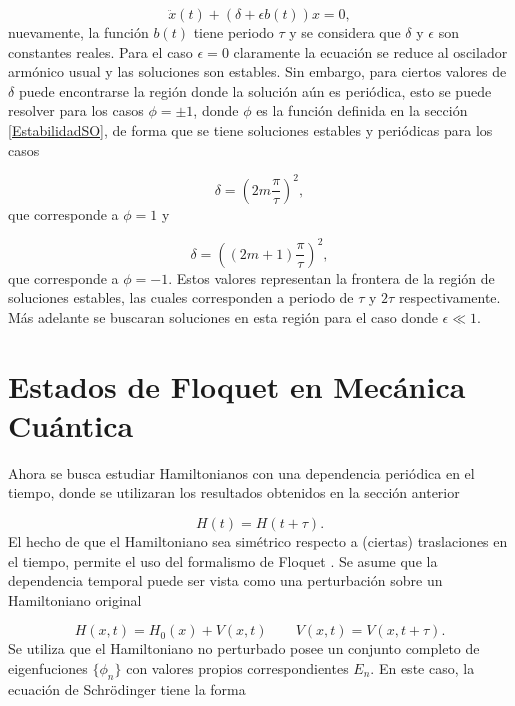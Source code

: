 \documentclass[10pt,a4paper]{report}
\begin{document}
\begin{equation}
\ddot{x}(t) + (\delta + \epsilon b(t))x = 0,
\end{equation} nuevamente, la función $b(t)$ tiene periodo $\tau$ y se considera que $\delta$ y $\epsilon$ son constantes reales. Para el caso $\epsilon = 0$ claramente la ecuación se reduce al oscilador armónico usual y las soluciones son estables. Sin embargo, para ciertos valores de $\delta$ puede encontrarse la región donde la solución aún es periódica, esto se puede resolver para los casos $\phi = \pm 1$, donde $\phi$ es la función definida en la sección \eqref{EstabilidadSO}, de forma que se tiene soluciones estables y periódicas para los casos

\begin{equation}
\delta = (2m\frac{\pi}{\tau})^2, 
\end{equation} que corresponde a $\phi=1$ y

\begin{equation}
\delta = ((2m+1)\frac{\pi}{\tau})^2,
\end{equation} que corresponde a $\phi=-1$. Estos valores representan la frontera de la región de soluciones estables, las cuales corresponden a periodo de $\tau$ y $2\tau$ respectivamente. Más adelante se buscaran soluciones en esta región para el caso donde $\epsilon \ll 1$.


\section{Estados de Floquet en Mecánica Cuántica}

Ahora se busca estudiar Hamiltonianos con una dependencia periódica en el tiempo, donde se utilizaran los resultados obtenidos en la sección anterior

\begin{equation}
H(t)=H(t+\tau).
\end{equation} El hecho de que el Hamiltoniano sea simétrico respecto a (ciertas) traslaciones en el tiempo, permite el uso del formalismo de Floquet \cite{HanngiDQS}. Se asume que la dependencia temporal puede ser vista como una perturbación sobre un Hamiltoniano original

\begin{equation}
H(x,t)=H_0(x)+V(x,t) \qquad V(x,t)=V(x,t+\tau).
\end{equation} Se utiliza que el Hamiltoniano no perturbado posee un conjunto completo de eigenfuciones $\{\phi_n\}$ con valores propios correspondientes $E_n$. En este caso, la ecuación de Schr\"{o}dinger tiene la forma
\end{document}
